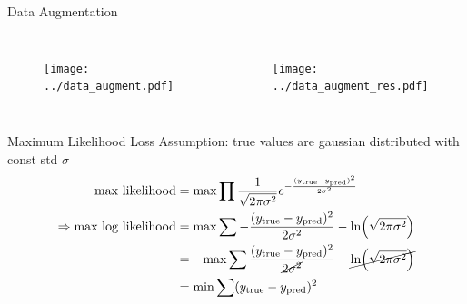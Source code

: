 \documentclass[10pt]{beamer}
\begin{document}
\begin{frame}{Data Augmentation}
  \begin{columns}
    \begin{figure}[htp]
      \texttt{[image: ../data\_augment.pdf]}
    \end{figure}
    \begin{figure}[htp]
      \texttt{[image: ../data\_augment\_res.pdf]}
    \end{figure}
  \end{columns}
\end{frame}

\begin{frame}{Maximum Likelihood Loss}
Assumption: true values are gaussian distributed with const std $\sigma$
  \begin{align*}
    \text{max likelihood} &= \text{max} \prod \frac{1}{\sqrt{2\pi \sigma^2}} e^{-\frac{(y_{\text{true}}-y_{\text{pred}})^2}{2 \sigma^2}}                          \\
    \Rightarrow \text{max log likelihood} & =\text{max} \sum -\frac{(y_{\text{true}}-y_{\text{pred}})^2}{2 \sigma^2} - \ln(\sqrt{2\pi \sigma^2})                  \\
                                          & =-\text{max} \sum\frac{(y_{\text{true}}-y_{\text{pred}})^2}{\cancel{2 \sigma^2}} - \cancel{\ln(\sqrt{2\pi \sigma^2})} \\
                                          & = \text{min} \sum (y_{\text{true}}-y_{\text{pred}})^2
  \end{align*}
\end{frame}
\end{document}
